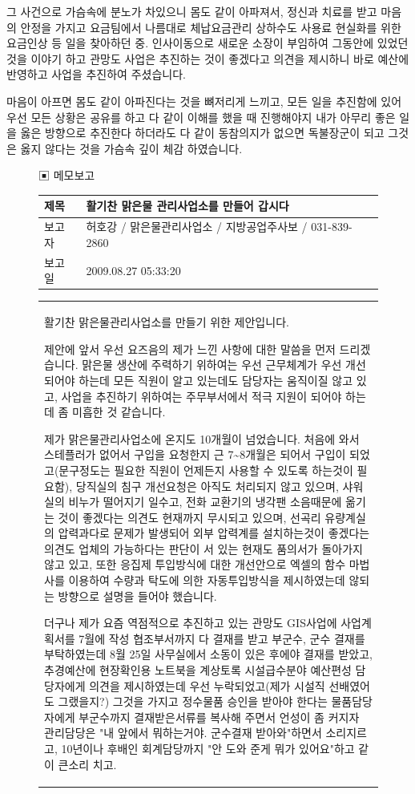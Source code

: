 \documentclass[chapter,book,openany,twoside]{oblivoir}
\begin{document}
그 사건으로 가슴속에 분노가 차있으니 몸도 같이 아파져서, 정신과 치료를 받고 마음의 안정을 가지고 요금팀에서 나름대로 체납요금관리 상하수도 사용료 현실화를 위한 요금인상 등 일을 찾아하던 중. 인사이동으로 새로운 소장이 부임하여 그동안에 있었던 것을 이야기 하고 관망도 사업은 추진하는 것이 좋겠다고 의견을 제시하니 바로 예산에 반영하고 사업을 추진하여 주셨습니다.

마음이 아프면 몸도 같이 아파진다는 것을 뼈저리게 느끼고, 모든 일을 추진함에 있어 우선 모든 상황은 공유를 하고 다 같이 이해를 했을 때 진행해야지 내가 아무리 좋은 일을 옳은 방향으로 추진한다 하더라도 다 같이 동참의지가 없으면 독불장군이 되고 그것은 옳지 않다는 것을 가슴속 깊이 체감 하였습니다. 
\begin{figure}
▣ 메모보고

\tabulinesep=1.2mm
\begin{tabu} to \linewidth{|X[1,c]|X[4,c]|}
\hline
제목 & 활기찬 맑은물 관리사업소를 만들어 갑시다 \\ \hline
보고자 & 허호강 / 맑은물관리사업소 / 지방공업주사보 / 031-839-2860 \\ \hline
보고일 & 2009.08.27 05:33:20 \\ \hline
\end{tabu}
\begin{tabu} to \linewidth{|X[j]|}

활기찬 맑은물관리사업소를 만들기 위한 제안입니다.

제안에 앞서 우선 요즈음의 제가 느낀 사항에 대한 말씀을 먼저  드리겠습니다. 맑은물 생산에 주력하기 위하여는 우선 근무체계가 우선 개선되어야 하는데 모든 직원이 알고 있는데도 담당자는 움직이질 않고 있고, 사업을 추진하기 위하여는 주무부서에서 적극 지원이 되어야 하는데 좀 미흡한 것 같습니다.

제가 맑은물관리사업소에 온지도 10개월이 넘었습니다. 처음에 와서 스테플러가 없어서 구입을 요청한지 근 7\textasciitilde8개월은 되어서 구입이 되었고(문구정도는 필요한 직원이 언제든지 사용할 수 있도록 하는것이 필요함), 당직실의 침구 개선요청은 아직도 처리되지 않고 있으며, 샤워실의 비누가 떨어지기 일수고,  전화 교환기의 냉각팬 소음때문에 옮기는 것이 좋겠다는 의견도 현재까지 무시되고 있으며, 선곡리 유량계실의 압력과다로 문제가 발생되어 외부 압력계를 설치하는것이 좋겠다는 의견도 업체의 가능하다는 판단이 서 있는 현재도 품의서가 돌아가지 않고 있고, 또한 응집제 투입방식에 대한 개선안으로 엑셀의 함수 마법사를 이용하여 수량과 탁도에 의한 자동투입방식을 제시하였는데 않되는 방향으로 설명을 들어야 했습니다.

더구나 제가 요즘 역점적으로 추진하고 있는 관망도 GIS사업에 사업계획서를 7월에 작성 협조부서까지 다 결재를 받고 부군수, 군수 결재를 부탁하였는데 8월 25일 사무실에서 소동이 있은 후에야 결재를 받았고, 추경예산에 현장확인용 노트북을 계상토록 시설급수분야 예산편성 담당자에게 의견을 제시하였는데 우선 누락되었고(제가 시설직 선배였어도 그랬을지?) 그것을 가지고 정수물품 승인을 받아야 한다는 물품담당자에게 부군수까지 결재받은서류를 복사해 주면서 언성이 좀 커지자 관리담당은 "내 앞에서 뭐하는거야. 군수결재 받아와"하면서 소리지르고, 10년이나 후배인 회계담당까지 "안 도와 준게 뭐가 있어요"하고 같이 큰소리 치고.


\end{tabu}
\end{figure}
\end{document}
